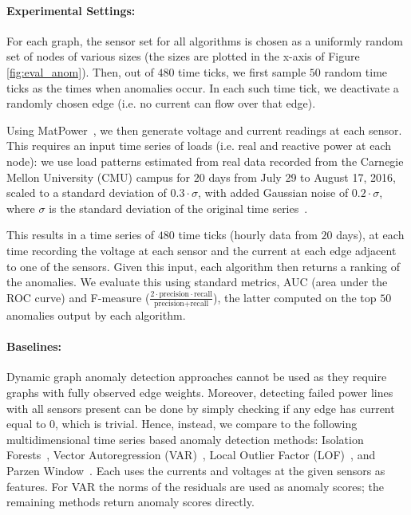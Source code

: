 \paragraph{\bf Experimental Settings:} For each graph, the sensor set for all algorithms is chosen as a uniformly random set of nodes of various sizes (the sizes are plotted in the x-axis of Figure \ref{fig:eval_anom}). Then, out of $480$ time ticks, we first sample $50$ random time ticks as the times when anomalies occur. In each such time tick, we deactivate a randomly chosen edge (i.e. no current can flow over that edge). 

Using MatPower~\cite{zimmerman2011matpower}, we then generate voltage and current readings at each sensor. This requires an input time series of loads (i.e. real and reactive power at each node): we use load patterns estimated from real data \cite{song2017powercast} recorded from the Carnegie Mellon University (CMU) campus for $20$ days from July 29 to August 17, 2016, scaled to a standard deviation of $0.3\cdot \sigma$, with added Gaussian noise of $0.2\cdot \sigma$, where $\sigma$ is the standard deviation of the original time series~\cite{song2017powercast}. 

This results in a time series of $480$ time ticks (hourly data from $20$ days), at each time recording the voltage at each sensor and the current at each edge adjacent to one of the sensors. Given this input, each algorithm then returns a ranking of the anomalies. We evaluate this using standard metrics, AUC (area under the ROC curve) and F-measure ($\frac{2\cdot \text{precision} \cdot \text{recall}}{\text{precision} + \text{recall}}$), the latter computed on the top $50$ anomalies output by each algorithm. 


\paragraph{\bf Baselines:} Dynamic graph anomaly detection approaches \cite{akoglu2010oddball,chen2012community,mongiovi2013netspot,araujo2014com2,shah2015timecrunch} cannot be used as they require graphs with fully observed edge weights. Moreover, detecting failed power lines with all sensors present can be done by simply checking if any edge has current equal to $0$, which is trivial. Hence, instead, we compare \methodD to the following multidimensional time series based anomaly detection methods: Isolation Forests~\cite{liu2008isolation}, Vector Autoregression (VAR)~\cite{hamilton1994time}, Local Outlier Factor (LOF)~\cite{breunig2000lof}, and Parzen Window~\cite{parzen1962estimation}. Each uses the currents and voltages at the given sensors as features. For VAR the norms of the residuals are used as anomaly scores; the remaining methods return anomaly scores directly.

